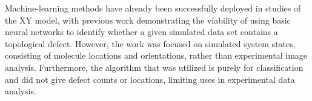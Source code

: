 \documentclass[twoside,twocolumn,9pt]{article}
\begin{document}
Machine-learning methods have already been successfully deployed in studies of the XY model, with previous work demonstrating the viability of using basic neural networks to identify whether a given simulated data set contains a topological defect\cite{walters_machine_2019}. However, the work was focused on simulated system states, consisting of molecule locations and orientations, rather than experimental image analysis. Furthermore, the algorithm that was utilized is purely for classification and did not give defect counts or locations, limiting uses in experimental data analysis.





\end{document}
